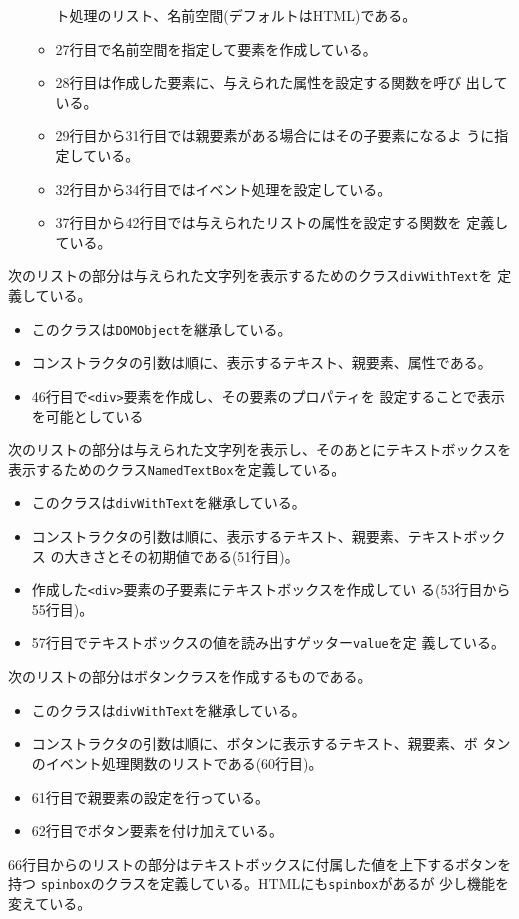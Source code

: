 \begin{itemize}
\begin{itemize}
              ト処理のリスト、名前空間(デフォルトはHTML)である。
        \item 27行目で名前空間を指定して要素を作成している。
        \item 28行目は作成した要素に、与えられた属性を設定する関数を呼び
              出している。
        \item 29行目から31行目では親要素がある場合にはその子要素になるよ
              うに指定している。
        \item 32行目から34行目ではイベント処理を設定している。
        \item 37行目から42行目では与えられたリストの属性を設定する関数を
              定義している。
       \end{itemize}
\end{itemize}
次のリストの部分は与えられた文字列を表示するためのクラス\texttt{divWithText}を
定義している。
\begin{itemize}
 \item このクラスは\texttt{DOMObject}を継承している。
 \item コンストラクタの引数は順に、表示するテキスト、親要素、属性である。
 \item 46行目で\texttt{<div>}要素を作成し、その要素のプロパティを
       設定することで表示を可能としている
\end{itemize}
次のリストの部分は与えられた文字列を表示し、そのあとにテキストボックスを
表示するためのクラス\texttt{NamedTextBox}を定義している。
\begin{itemize}
 \item このクラスは\texttt{divWithText}を継承している。
 \item コンストラクタの引数は順に、表示するテキスト、親要素、テキストボックス
       の大きさとその初期値である(51行目)。
 \item 作成した\texttt{<div>}要素の子要素にテキストボックスを作成してい
       る(53行目から55行目)。
 \item 57行目でテキストボックスの値を読み出すゲッター\texttt{value}を定
       義している。
\end{itemize}
次のリストの部分はボタンクラスを作成するものである。
\begin{itemize}
 \item このクラスは\texttt{divWithText}を継承している。
 \item コンストラクタの引数は順に、ボタンに表示するテキスト、親要素、ボ
       タンのイベント処理関数のリストである(60行目)。
 \item 61行目で親要素の設定を行っている。
 \item 62行目でボタン要素を付け加えている。
\end{itemize}
66行目からのリストの部分はテキストボックスに付属した値を上下するボタンを持つ
\texttt{spinbox}のクラスを定義している。HTMLにも\texttt{spinbox}があるが
少し機能を変えている。

